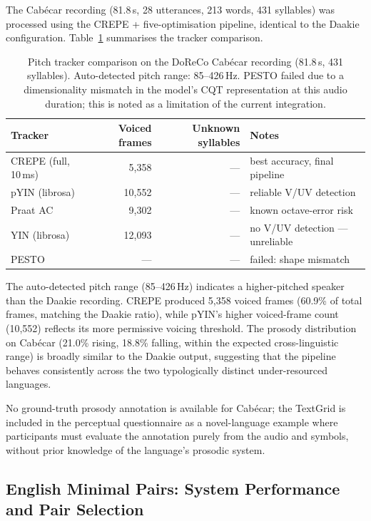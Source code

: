 The Cabécar recording (81.8\,s, 28 utterances, 213 words, 431 syllables) was
processed using the CREPE + five-optimisation pipeline, identical to the Daakie
configuration. Table~\ref{tab:cabeca_trackers} summarises the tracker comparison.

\begin{table}[h]
\centering
\caption{Pitch tracker comparison on the DoReCo Cabécar recording (81.8\,s,
431 syllables). Auto-detected pitch range: 85--426\,Hz.
PESTO failed due to a dimensionality mismatch in the model's CQT representation
at this audio duration; this is noted as a limitation of the current integration.}
\label{tab:cabeca_trackers}
\small
\begin{tabular}{lrrl}
\hline
Tracker & Voiced frames & Unknown syllables & Notes \\
\hline
CREPE (full, 10\,ms)  & 5{,}358  & ---   & best accuracy, final pipeline \\
pYIN (librosa)        & 10{,}552 & ---   & reliable V/UV detection \\
Praat AC              & 9{,}302  & ---   & known octave-error risk \\
YIN (librosa)         & 12{,}093 & ---   & no V/UV detection --- unreliable \\
PESTO                 & ---      & ---   & failed: shape mismatch \\
\hline
\end{tabular}
\end{table}

The auto-detected pitch range (85--426\,Hz) indicates a higher-pitched speaker
than the Daakie recording. CREPE produced 5{,}358 voiced frames (60.9\% of
total frames, matching the Daakie ratio), while pYIN's higher voiced-frame count
(10{,}552) reflects its more permissive voicing threshold. The prosody
distribution on Cabécar (21.0\% rising, 18.8\% falling, within the expected
cross-linguistic range) is broadly similar to the Daakie output, suggesting
that the pipeline behaves consistently across the two typologically distinct
under-resourced languages.

No ground-truth prosody annotation is available for Cabécar; the TextGrid is
included in the perceptual questionnaire as a novel-language example where
participants must evaluate the annotation purely from the audio and symbols,
without prior knowledge of the language's prosodic system.

\subsection{English Minimal Pairs: System Performance and Pair Selection}
\label{sec:english_analysis}

